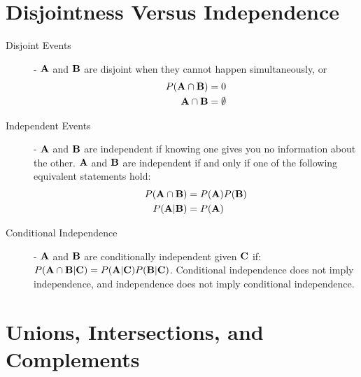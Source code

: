 \documentclass[11pt]{article}
\begin{document}
\section*{Disjointness Versus Independence}

  \begin{description}
    \item[Disjoint Events] - ${\bf A}$ and ${\bf B}$ are disjoint when they cannot happen simultaneously, or
      \begin{align*}
      P({\bf A} \cap {\bf B}) &= 0\\
      {\bf A} \cap {\bf B} &= \emptyset
      \end{align*}
    \item[Independent Events] - ${\bf A}$ and ${\bf B}$ are independent if knowing one gives you no information about the other. ${\bf A}$ and ${\bf B}$ are independent if and only if one of the following equivalent statements hold:
       \begin{align*}
      P({\bf A}\cap {\bf B}) &= P({\bf A})P({\bf B}) \\
      P({\bf A}|{\bf B}) &= P({\bf A})
       \end{align*}

    \item[Conditional Independence] - ${\bf A}$ and ${\bf B}$ are conditionally independent given ${\bf C}$ if: $P({\bf A}\cap {\bf B}|{\bf C}) = P({\bf A}|{\bf C})P({\bf B}|{\bf C})$. Conditional independence does not imply independence, and independence does not imply conditional independence.
  \end{description}

\section*{Unions, Intersections, and Complements}
\end{document}
